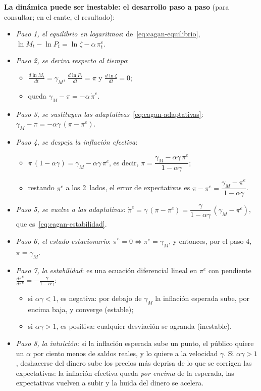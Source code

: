 \documentclass[11pt]{article}
\begin{document}
\begin{anotaciones}
\textbf{La dinámica puede ser inestable: el desarrollo paso a paso} (para consultar; en el cante, el resultado):
\begin{itemize}
\item \emph{Paso 1, el equilibrio en logaritmos}: de~\eqref{eq:cagan-equilibrio}, $\ln M_t-\ln P_t=\ln\zeta-\alpha\,\pi^e_t$.
\item \emph{Paso 2, se deriva respecto al tiempo}:
  \begin{itemize}
  \item $\frac{d\ln M_t}{dt}=\gamma_M$, $\frac{d\ln P_t}{dt}=\pi$ y $\frac{d\ln\zeta}{dt}=0$;
  \item queda $\gamma_M-\pi=-\alpha\,\dot\pi^e$.
  \end{itemize}
\item \emph{Paso 3, se sustituyen las adaptativas}~\eqref{eq:cagan-adaptativas}: $\gamma_M-\pi=-\alpha\gamma\,(\pi-\pi^e)$.
\item \emph{Paso 4, se despeja la inflación efectiva}:
  \begin{itemize}
  \item $\pi\,(1-\alpha\gamma)=\gamma_M-\alpha\gamma\,\pi^e$, es decir, $\pi=\dfrac{\gamma_M-\alpha\gamma\,\pi^e}{1-\alpha\gamma}$;
  \item restando $\pi^e$ a los 2~lados, el error de expectativas es $\pi-\pi^e=\dfrac{\gamma_M-\pi^e}{1-\alpha\gamma}$.
  \end{itemize}
\item \emph{Paso 5, se vuelve a las adaptativas}: $\dot\pi^e=\gamma\,(\pi-\pi^e)=\dfrac{\gamma}{1-\alpha\gamma}\,(\gamma_M-\pi^e)$, que es~\eqref{eq:cagan-estabilidad}.
\item \emph{Paso 6, el estado estacionario}: $\dot\pi^e=0\iff\pi^e=\gamma_M$, y entonces, por el paso 4, $\pi=\gamma_M$.
\item \emph{Paso 7, la estabilidad}: es una ecuación diferencial lineal en $\pi^e$ con pendiente $\frac{d\dot\pi^e}{d\pi^e}=-\frac{\gamma}{1-\alpha\gamma}$:
  \begin{itemize}
  \item si $\alpha\gamma<1$, es negativa: por debajo de $\gamma_M$ la inflación esperada sube, por encima baja, y converge (estable);
  \item si $\alpha\gamma>1$, es positiva: cualquier desviación se agranda (inestable).
  \end{itemize}
\item \emph{Paso 8, la intuición}: si la inflación esperada sube un punto, el público quiere un $\alpha$ por ciento menos de saldos reales, y lo quiere a la velocidad $\gamma$. Si $\alpha\gamma>1$, deshacerse del dinero sube los precios más deprisa de lo que se corrigen las expectativas: la inflación efectiva queda \emph{por encima} de la esperada, las expectativas vuelven a subir y la huida del dinero se acelera.
\end{itemize}
\end{anotaciones}
\end{document}
